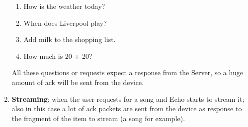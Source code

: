 \documentclass[sigconf]{acmart}
\begin{document}
\begin{enumerate}
\begin{enumerate}
            \item How is the weather today?
            \item When does Liverpool play?
            \item Add milk to the shopping list.
            \item How much is 20 + 20?
        \end{enumerate}
        All these questions or requests expect a response from the Server, so a huge amount of ack will be sent from the device.
        \item \textbf{Streaming}: when the user requests for a song and Echo starts to stream it; also in this case a lot of ack packets are sent from the device as response to the fragment of the item to stream (a song for example).
    \end{enumerate}
\end{document}
